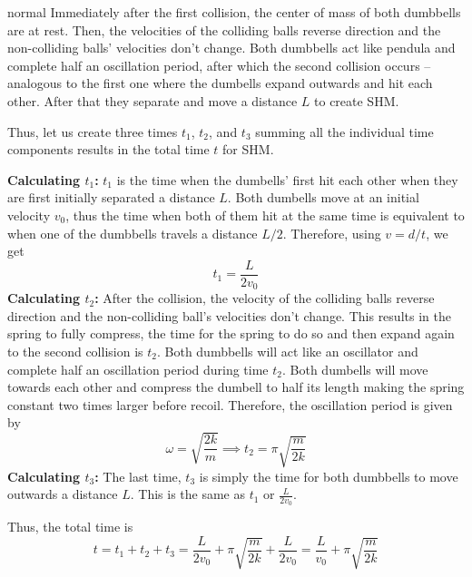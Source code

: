 \begin{solution}{normal}
Immediately after the first collision, the center of mass of both dumbbells are at rest. Then, the velocities of the colliding balls reverse direction and the non-colliding balls’ velocities don’t change. Both dumbbells act like pendula and complete half an oscillation period, after which the second collision occurs – analogous to the first one where the dumbells expand outwards and hit each other. After that they separate and move a distance $L$ to create SHM.
\vspace{3mm}

Thus, let us create three times $t_1$, $t_2$, and $t_3$ summing all the individual time components results in the total time $t$ for SHM.
\vspace{3mm}

\textbf{Calculating $t_1$:} $t_1$ is the time when the dumbells' first hit each other when they are first initially separated a distance $L$. Both dumbells move at an initial velocity $v_0$, thus the time when both of them hit at the same time is equivalent to when one of the dumbbells travels a distance $L/2$. Therefore, using $v=d/t$, we get
\[
t_1 = \frac{L}{2v_0}
\]
\textbf{Calculating $t_2$:} After the collision, the velocity of the colliding balls reverse direction and the non-colliding ball's velocities don't change. This results in the spring to fully compress, the time for the spring to do so and then expand again to the second collision is $t_2$. Both dumbbells will act like an oscillator and complete half an oscillation period during time $t_2$. Both dumbells will move towards each other and compress the dumbell to half its length making the spring constant two times larger before recoil. Therefore, the oscillation period is given by
\[
\omega =\sqrt{\frac{2k}{m}}\implies t_2 = \pi\sqrt{\frac{m}{2k}}
\]
\textbf{Calculating $t_3$:} The last time, $t_3$ is simply the time for both dumbbells to move outwards a distance $L$. This is the same as $t_1$ or $\frac{L}{2v_0}$.
\vspace{3mm}

Thus, the total time is
\[
t = t_1 + t_2 + t_3 = \frac{L}{2v_0} + \pi\sqrt{\frac{m}{2k}} + \frac{L}{2v_0} = \boxed{\frac{L}{v_0} + \pi\sqrt{\frac{m}{2k}}}
\]

\end{solution}
